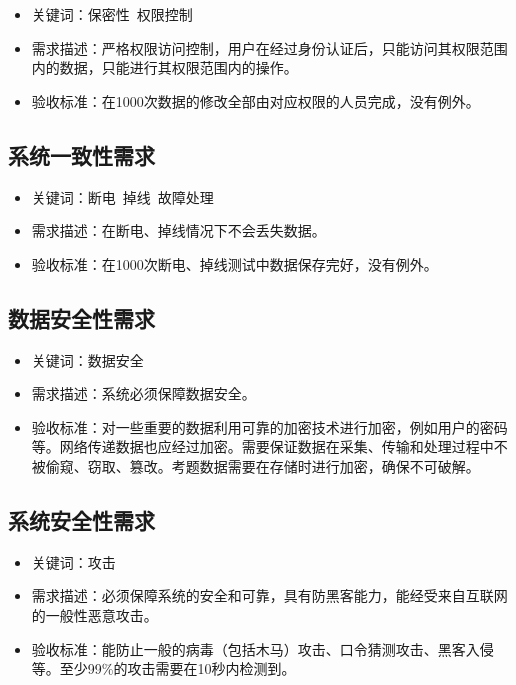 \documentclass[hyperref, a4paper]{ctexart}
\providecommand{\tightlist}{%
  \setlength{\itemsep}{0pt}\setlength{\parskip}{0pt}}
\begin{document}
\begin{itemize}
\tightlist
\item
  关键词：保密性~权限控制
\item
  需求描述：严格权限访问控制，用户在经过身份认证后，只能访问其权限范围内的数据，只能进行其权限范围内的操作。
\item
  验收标准：在1000次数据的修改全部由对应权限的人员完成，没有例外。
\end{itemize}

\hypertarget{ux7cfbux7edfux4e00ux81f4ux6027ux9700ux6c42}{%
\subsection{系统一致性需求}\label{ux7cfbux7edfux4e00ux81f4ux6027ux9700ux6c42}}

\begin{itemize}
\tightlist
\item
  关键词：断电~掉线~故障处理
\item
  需求描述：在断电、掉线情况下不会丢失数据。
\item
  验收标准：在1000次断电、掉线测试中数据保存完好，没有例外。
\end{itemize}

\hypertarget{ux6570ux636eux5b89ux5168ux6027ux9700ux6c42}{%
\subsection{数据安全性需求}\label{ux6570ux636eux5b89ux5168ux6027ux9700ux6c42}}

\begin{itemize}
\tightlist
\item
  关键词：数据安全
\item
  需求描述：系统必须保障数据安全。
\item
  验收标准：对一些重要的数据利用可靠的加密技术进行加密，例如用户的密码等。网络传递数据也应经过加密。需要保证数据在采集、传输和处理过程中不被偷窥、窃取、篡改。考题数据需要在存储时进行加密，确保不可破解。
\end{itemize}

\hypertarget{ux7cfbux7edfux5b89ux5168ux6027ux9700ux6c42}{%
\subsection{系统安全性需求}\label{ux7cfbux7edfux5b89ux5168ux6027ux9700ux6c42}}

\begin{itemize}
\tightlist
\item
  关键词：攻击
\item
  需求描述：必须保障系统的安全和可靠，具有防黑客能力，能经受来自互联网的一般性恶意攻击。
\item
  验收标准：能防止一般的病毒（包括木马）攻击、口令猜测攻击、黑客入侵等。至少99\%的攻击需要在10秒内检测到。
\end{itemize}
\end{document}
